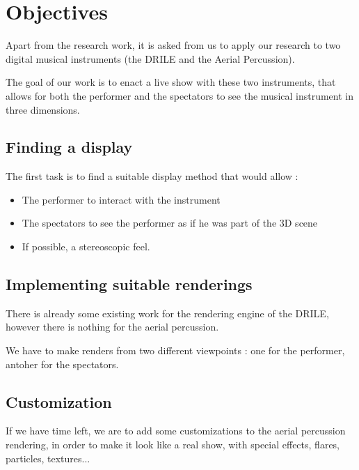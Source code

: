 \section{Objectives}
Apart from the research work, it is asked from us to apply our research to two digital musical instruments (the DRILE and the Aerial Percussion).

The goal of our work is to enact a live show with these two instruments, that allows for both the performer and the spectators to see the musical instrument in three dimensions.

\subsection{Finding a display}
The first task is to find a suitable display method that would allow : 
\begin{itemize}
\item The performer to interact with the instrument
\item The spectators to see the performer as if he was part of the 3D scene
\item If possible, a stereoscopic feel.
\end{itemize}

\subsection{Implementing suitable renderings}
There is already some existing work for the rendering engine of the DRILE, however there is nothing for the aerial percussion.

We have to make renders from two different viewpoints : one for the performer, antoher for the spectators.

\subsection{Customization}
If we have time left, we are to add some customizations to the aerial percussion rendering, in order to make it look like a real show, with special effects, flares, particles, textures...